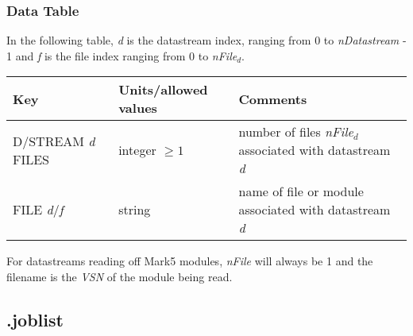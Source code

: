 \subsubsection{Data Table}

In the following table, {\em d} is the datastream index, ranging from 0 to {\em nDatastream} - 1 and {\em f} is the file index ranging from 0 to {\em nFile$_\mathit{d}$}.

\begin{center}
\begin{tabular}{l l l}
\hline
Key & Units/allowed values & Comments \\
\hline
D/STREAM {\em d} FILES & integer $\ge 1$ & number of files {\em nFile$_\mathit{d}$} associated with datastream {\em d} \\
FILE {\em d}/{\em f} & string & name of file or module associated with datastream {\em d} \\
\hline
\end{tabular}
\end{center}

For datastreams reading off Mark5 modules, {\em nFile} will always be 1 and the filename is the {\em VSN} of the module being read.








\subsection{.joblist} \label{sec:joblistfile}

